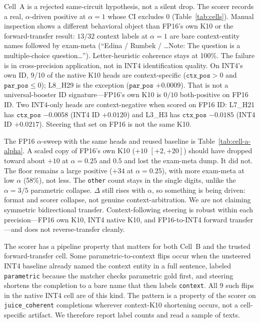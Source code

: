\documentclass{article} %
\begin{document}
Cell~A is a rejected same-circuit hypothesis, not a silent drop. The scorer records a real, $\alpha$-driven positive at $\alpha{=}1$ whose CI excludes 0 (Table~\ref{tab:cells}). Manual inspection shows a different behavioral object than FP16's own K10 or the forward-transfer result: $13/32$ context labels at $\alpha{=}1$ are bare context-entity names followed by exam-meta (``Edina / Rumbek / \ldots Note: The question is a multiple-choice question\ldots''). Letter-heuristic coherence stays at 100\%. The failure is in cross-precision application, not in INT4 identification quality. On INT4's own ID, 9/10 of the native K10 heads are context-specific ($\texttt{ctx\_pos}{>}0$ and $\texttt{par\_pos}{\le}0$); L8\_H29 is the exception ($\texttt{par\_pos}$ $+0.0009$). That is not a universal-booster ID signature---FP16's own K10 is $0/10$ both-positive on FP16 ID. Two INT4-only heads are context-negative when scored on FP16 ID: L7\_H21 has $\texttt{ctx\_pos}$ $-0.0058$ (INT4 ID $+0.0120$) and L3\_H3 has $\texttt{ctx\_pos}$ $-0.0185$ (INT4 ID $+0.0217$). Steering that set on FP16 is not the same K10.

The FP16 $\alpha$-sweep with the same heads and reused baseline is Table~\ref{tab:cell-a-alpha}. A scaled copy of FP16's own K10 ($+10$ $[+2, +20]$) should have dropped toward about $+10$ at $\alpha{=}0.25$ and $0.5$ and lost the exam-meta dump. It did not. The floor remains a large positive ($+34$ at $\alpha{=}0.25$), with more exam-meta at low $\alpha$ (58\%), not less. The \texttt{other} count stays in the single digits, unlike the $\alpha{=}3/5$ parametric collapse. $\Delta$ still rises with $\alpha$, so something is being driven: format and scorer collapse, not genuine context-arbitration. We are not claiming symmetric bidirectional transfer. Context-following steering is robust within each precision---FP16 own K10, INT4 native K10, and FP16-to-INT4 forward transfer---and does not reverse-transfer cleanly.

The scorer has a pipeline property that matters for both Cell~B and the trusted forward-transfer cell. Some parametric-to-context flips occur when the unsteered INT4 baseline already named the context entity in a full sentence, labeled \texttt{parametric} because the matcher checks parametric gold first, and steering shortens the completion to a bare name that then labels \texttt{context}. All 9 such flips in the native INT4 cell are of this kind. The pattern is a property of the scorer on \texttt{juice\_coherent} completions wherever context-K10 shortening occurs, not a cell-specific artifact. We therefore report label counts and read a sample of texts.
\end{document}
